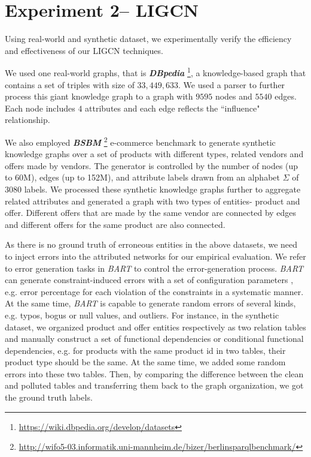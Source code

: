 \section{Experiment 2-- LIGCN}
\label{sec-expt}

Using real-world and synthetic dataset, we experimentally verify the efficiency and effectiveness of our LIGCN techniques.

 We used one real-world graphs, that is \textbf{{\em DBpedia}} \footnote{\scriptsize\url{https://wiki.dbpedia.org/develop/datasets}}, a knowledge-based graph that contains a set of triples with size of $33,449,633$. We used a parser to further process this giant knowledge graph to a graph with $9595$ nodes and $5540$ edges.
Each node includes $4$ attributes and each edge reflects the ``influence" relationship.

We also employed \textbf{{\em BSBM}} \footnote{\scriptsize\url{http://wifo5-03.informatik.uni-mannheim.de/bizer/berlinsparqlbenchmark/}}
e-commerce benchmark to generate synthetic knowledge graphs over a set of products with different
types, related vendors and offers made by vendors. The generator is
controlled by the number of nodes (up to 60M), edges (up to
152M), and attribute labels drawn from an alphabet $\Sigma$ of $3080$ labels. We processed these synthetic knowledge graphs further to aggregate related attributes and generated a graph with two types of entities- product and offer. Different offers that are made by the same vendor are connected by edges and different offers for the same product are also connected. 

As there is no ground truth of erroneous entities in the above datasets, we need to inject errors into the attributed networks for our empirical evaluation. We refer to error generation tasks in {\em BART} \cite{arocena2015messing} to control the error-generation process. {\em BART} can generate constraint-induced errors with a set of configuration parameters , e.g. error percentage for each violation of the constraints in a systematic manner. At the same time, {\em BART} is capable to generate random errors of several kinds, e.g. typos, bogus or null values, and outliers. For instance, in the synthetic dataset, we organized product and offer entities respectively as two relation tables and manually construct a set of functional dependencies or conditional functional dependencies,  e.g. for products with the same product id in two tables, their product type should be the same. At the same time, we added some random errors into these two tables. Then, by comparing the difference between the clean and polluted tables and transferring them back to the graph organization, we got the ground truth labels.

